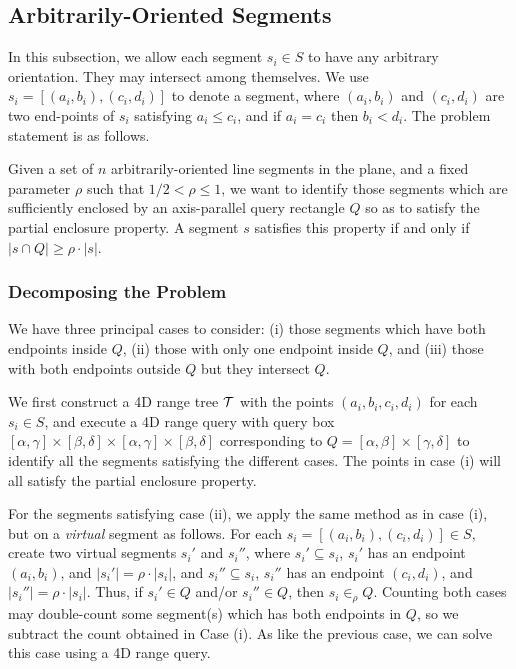\subsection{Arbitrarily-Oriented Segments}
\label{:rectangles:ao}

In this subsection, we allow each segment $s_i \in S$ to have any 
arbitrary orientation. They may intersect among themselves. We use 
$s_i= [(a_i,b_i), (c_i,d_i)]$ to denote a segment, where $(a_i,b_i)$ 
and $(c_i,d_i)$ are two end-points of $s_i$ satisfying $a_i\leq c_i$, 
and if $a_i = c_i$ then $b_i < d_i$. The problem statement is as 
follows.

\begin{problem}
Given a set of $n$ arbitrarily-oriented line segments in the plane, and a 
fixed parameter $\rho$ such that $1/2 < \rho \leq 1$, we want to identify 
those segments which are sufficiently enclosed by an axis-parallel query 
rectangle $Q$ so as to satisfy the partial enclosure property. A segment 
$s$ satisfies this property if and only if $|s \cap Q| \geq \rho \cdot |s|$.
\end{problem}



\subsubsection{Decomposing the Problem}
\label{:rectangles:ao:approach}

We have three principal cases to consider: (i) those segments which 
have both endpoints inside $Q$, (ii) those with only one endpoint inside 
$Q$, and (iii) those with both endpoints outside $Q$ but they intersect $Q$.  

We first construct a 4D range tree $\cal T$ with the points $(a_i, b_i, c_i, d_i)$ 
for each $s_i \in S$, and execute a 4D range query with query box 
$[\alpha, \gamma] \times [\beta, \delta] \times [\alpha, \gamma] \times 
[\beta, \delta]$ corresponding to $Q=[\alpha,\beta] \times [\gamma,\delta]$ 
to identify all the segments satisfying the different cases. 
The points in case (i) will all satisfy the partial enclosure property.

For the segments satisfying case (ii), we apply the same method as in 
case (i), but on a {\it virtual} segment as follows. For each $s_i=
[(a_i,b_i),(c_i,d_i)] \in S$, create two virtual segments $s_i'$ and 
$s_i''$, where $s_i' \subseteq s_i$, $s_i'$ has an endpoint $(a_i,b_i)$, 
and $|s_i'| = \rho \cdot |s_i|$, and $s_i'' \subseteq s_i$, $s_i''$ 
has an endpoint $(c_i,d_i)$, and $|s_i''| = \rho \cdot |s_i|$. Thus, if 
$s_i' \in Q$ and/or $s_i'' \in Q$, then $s_i \in_\rho Q$. Counting both 
cases may double-count some 
segment(s) which has both endpoints in $Q$, so we subtract the count 
obtained in Case (i). 
As like the previous case, we can solve this case using a 4D range query.

